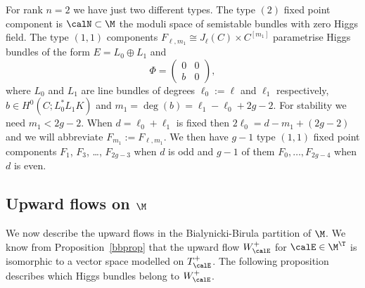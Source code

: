 \begin{remark}
\notready \label{remarkn2} For rank $n=2$ we have just two different types. The type $(2)$ fixed point component is $\calN\subset \M$ the moduli space of semistable bundles with zero Higgs field. The type $(1,1)$ components $F_{\ell,m_1}\cong J_\ell(C)\times C^{[m_1]}$ parametrise Higgs bundles of the form $E=L_0\oplus L_1$ and $$\Phi=\left(\begin{array}{cc}0&0\\b&0\end{array} \right),$$ where $L_0$ and $L_1$ are line bundles of degrees $\ell_0:=\ell$ and $\ell_1$ respectively, $b\in H^0(C;L_0^*L_1K)$ and $m_1=\deg(b)=\ell_1-\ell_0+2g-2$. For stability we need $m_1<2g-2$. When $d=\ell_0+\ell_1$ is fixed then $2\ell_0=d-m_1+(2g-2)$ and we will abbreviate  $F_{m_1}:=F_{\ell,m_1}$. We then have $g-1$ type $(1,1)$ fixed point components $F_{1}$, $F_3$, \dots, $F_{2g-3}$ when $d$ is odd and $g-1$ of them $F_0,\dots, F_{2g-4}$ when $d$ is even.
\end{remark}
\subsection{Upward flows on $\M$}

We  now describe the upward flows in the Bialynicki-Birula partition of $\M$. We know from Proposition~\ref{bbprop} that the upward flow $W^+_\calE$ for $\calE\in \M^\T$ is isomorphic to a vector space modelled on $T_\calE^+$. The following proposition describes which Higgs bundles belong to $W^+_\calE$.

